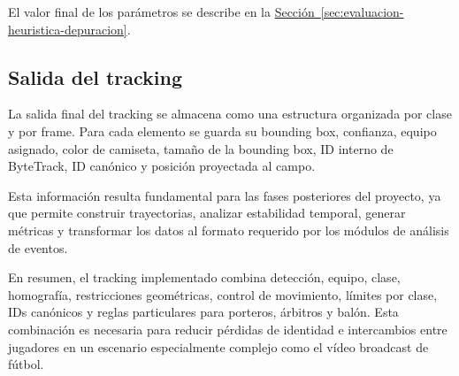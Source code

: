 El valor final de los parámetros se describe en la \hyperref[sec:evaluacion-heuristica-depuracion]{Sección~\ref*{sec:evaluacion-heuristica-depuracion}}.

\subsection{Salida del tracking}

La salida final del tracking se almacena como una estructura organizada por clase y por frame. Para cada elemento se guarda su bounding box, confianza, equipo asignado, color de camiseta, tamaño de la bounding box, ID interno de ByteTrack, ID canónico y posición proyectada al campo.

Esta información resulta fundamental para las fases posteriores del proyecto, ya que permite construir trayectorias, analizar estabilidad temporal, generar métricas y transformar los datos al formato requerido por los módulos de análisis de eventos.

En resumen, el tracking implementado combina detección, equipo, clase, homografía, restricciones geométricas, control de movimiento, límites por clase, IDs canónicos y reglas particulares para porteros, árbitros y balón. Esta combinación es necesaria para reducir pérdidas de identidad e intercambios entre jugadores en un escenario especialmente complejo como el vídeo broadcast de fútbol.
